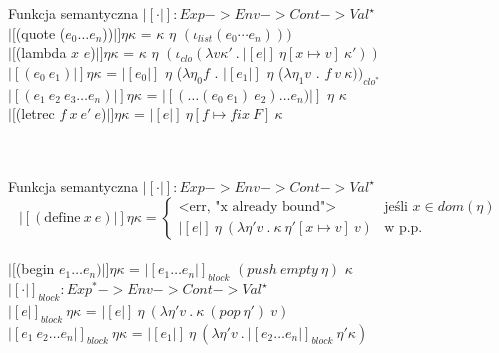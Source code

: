 \documentclass[12pt,serif]{beamer}
\begin{document}
\begin{frame}{Funkcja semantyczna}
$|[ \cdot |]: Exp -> Env -> Cont -> Val^{\star}$ \newline
\\
$|[$(quote ($e_0 \ldots e_n$))$|] \eta \kappa$ =
  $\kappa$ $\eta$ $(\iota_{list} (e_0 \cdots e_n)))$ \newline
\\
$|[$(lambda $x$ $e$)$|] \eta \kappa$ =
  $\kappa$ $\eta$ $(\iota_{clo} (\lambda v \kappa'~.~ |[e|]~\eta[x \mapsto v]~\kappa' ))$ \newline
\\
$|[(e_0~e_1)|] \eta \kappa$ =
  $|[e_0|]$ $\eta$ ($\lambda \eta_0 f$ .
  $|[e_1|]$ $\eta$ ($\lambda \eta_1 v$ . $f~v~\kappa))_{clo^{*}}$ \newline
\\
$|[(e_1~e_2~e_3 \ldots e_n)|] \eta \kappa$ =
  $|[ (\ldots(e_0~e_1)~e_2) \ldots e_n) |]$ $\eta$ $\kappa$ \newline
\\
$|[$(letrec $f~x~e'~e$)$|] \eta \kappa$ = $|[e|]~\eta[f \mapsto fix~F]~\kappa$ \\
\hspace{1em}{gdzie:} \\
\hspace{2em}{ $F~g~v~\kappa' = |[e'|] ~ \eta[f \mapsto g][x \mapsto v] ~ \kappa' $ } \\
\end{frame}

\begin{frame}{Funkcja semantyczna}
$|[ \cdot |]: Exp -> Env -> Cont -> Val^{\star}$ \newline
\\
\[
 |[(\text{define}~x~e)|] \eta \kappa =
  \begin{cases}
   \text{<err, "x already bound">} & \text{jeśli } x \in dom(\eta) \\
   |[e|] ~ \eta ~ (\lambda \eta' v ~. ~ \kappa ~ \eta'[x \mapsto v] ~ v) & \text{w p.p.}
  \end{cases}
\] \newline
\\
$|[$(begin $e_1 \ldots e_n)|] \eta \kappa$ =
  $|[e_1 \ldots e_n|]_{block}$ $(push~empty~\eta)$ $\kappa$ \newline
\\
$|[ \cdot |]_{block}: Exp^{*} -> Env -> Cont -> Val^{\star}$ \newline
\\
$|[ e |]_{block} ~\eta \kappa$ =
  $|[ e |] ~ \eta ~ (\lambda \eta' v ~ . ~ \kappa ~ (pop~\eta') ~ v)$ \\
$|[ e_1 ~ e_2 \ldots e_n |]_{block} ~\eta \kappa$ =
  $|[ e_1 |] ~ \eta ~ (\lambda \eta' v ~ . ~ |[ e_2 \ldots e_n |]_{block} ~ \eta' \kappa )$ \\
\end{frame}
\end{document}
